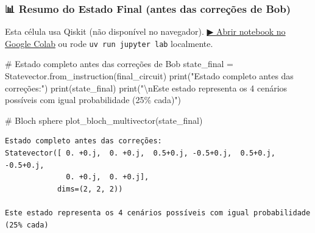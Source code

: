 \documentclass[
  brazilian,
]{report}
\newenvironment{Shaded}{\begin{snugshade}}{\end{snugshade}}
\newcommand{\BuiltInTok}[1]{\textcolor[rgb]{0.00,0.23,0.31}{#1}}
\newcommand{\CharTok}[1]{\textcolor[rgb]{0.13,0.47,0.30}{#1}}
\newcommand{\CommentTok}[1]{\textcolor[rgb]{0.37,0.37,0.37}{#1}}
\newcommand{\NormalTok}[1]{\textcolor[rgb]{0.00,0.23,0.31}{#1}}
\newcommand{\OperatorTok}[1]{\textcolor[rgb]{0.37,0.37,0.37}{#1}}
\newcommand{\SpecialCharTok}[1]{\textcolor[rgb]{0.37,0.37,0.37}{#1}}
\newcommand{\StringTok}[1]{\textcolor[rgb]{0.13,0.47,0.30}{#1}}
\begin{document}
\subsubsection{📊 Resumo do Estado Final (antes das correções de
Bob)}\label{resumo-do-estado-final-antes-das-correuxe7uxf5es-de-bob}

\begin{tcolorbox}[enhanced jigsaw, arc=.35mm, bottomrule=.15mm, bottomtitle=1mm, breakable, colback=white, colbacktitle=quarto-callout-warning-color!10!white, colframe=quarto-callout-warning-color-frame, coltitle=black, left=2mm, leftrule=.75mm, opacityback=0, opacitybacktitle=0.6, rightrule=.15mm, title=\textcolor{quarto-callout-warning-color}{\faExclamationTriangle}\hspace{0.5em}{⚛️ Célula Qiskit --- execute no Colab ou localmente}, titlerule=0mm, toprule=.15mm, toptitle=1mm]

Esta célula usa Qiskit (não disponível no navegador).
\href{https://colab.research.google.com/github/maxwellamaral/aula-quantum/blob/main/notebooks/02-teletransport.ipynb}{▶
Abrir notebook no Google Colab} ou rode \texttt{uv\ run\ jupyter\ lab}
localmente.

\begin{Shaded}
\begin{Highlighting}[]

\CommentTok{\# Estado completo antes das correções de Bob}
\NormalTok{state\_final }\OperatorTok{=}\NormalTok{ Statevector.from\_instruction(final\_circuit)}
\BuiltInTok{print}\NormalTok{(}\StringTok{"Estado completo antes das correções:"}\NormalTok{)}
\BuiltInTok{print}\NormalTok{(state\_final)}
\BuiltInTok{print}\NormalTok{(}\StringTok{"}\CharTok{\textbackslash{}n}\StringTok{Este estado representa os 4 cenários possíveis com igual probabilidade (25}\SpecialCharTok{\% c}\StringTok{ada)"}\NormalTok{)}

\CommentTok{\# Bloch sphere}
\NormalTok{plot\_bloch\_multivector(state\_final)}
\end{Highlighting}
\end{Shaded}

\end{tcolorbox}

\begin{verbatim}
Estado completo antes das correções:
Statevector([ 0. +0.j,  0. +0.j,  0.5+0.j, -0.5+0.j,  0.5+0.j, -0.5+0.j,
              0. +0.j,  0. +0.j],
            dims=(2, 2, 2))

Este estado representa os 4 cenários possíveis com igual probabilidade (25% cada)
\end{verbatim}
\end{document}
